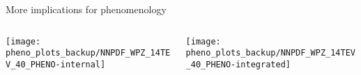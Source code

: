 \begin{frame}[t]{More implications for phenomenology}
    \begin{center}
        \begin{columns}
	        \begin{column}{0.48\textwidth}
	            \begin{center}
	                \texttt{[image: pheno\_plots\_backup/NNPDF\_WPZ\_14TEV\_40\_PHENO-internal]} 
	            \end{center}
	        \end{column}
	        \begin{column}{0.48\textwidth}
	            \texttt{[image: pheno\_plots\_backup/NNPDF\_WPZ\_14TEV\_40\_PHENO-integrated]}
	        \end{column}
        \end{columns}
    \end{center}
\end{frame}
